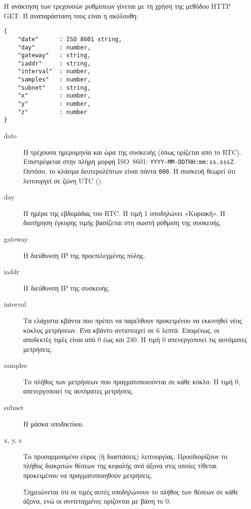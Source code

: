 
Η ανάκτηση των τρεχουσών ρυθμίσεων γίνεται με τη χρήση της μεθόδου HTTP GET. Η
αναπαράσταση τους είναι η ακόλουθη:
\begin{lstlisting}
{
    "date"      : ISO 8601 string,
    "day"       : number,
    "gateway"   : string,
    "iaddr"     : string,
    "interval"  : number,
    "samples"   : number,
    "subnet"    : string,
    "x"         : number,
    "y"         : number,
    "z"         : number
}
\end{lstlisting}
\begin{description}
    \item[date] Η τρέχουσα ημερομηνία και ώρα της συσκευής (όπως ορίζεται από το
    RTC). Επιστρέφεται στην πλήρη μορφή ISO~8601:
    \verb~YYYY-MM-DDTHH:mm:ss.sssZ~. Ωστόσο, το κλάσμα δευτερολέπτων είναι πάντα
    \verb~000~. Η συσκευή θεωρεί ότι λειτουργεί σε ζώνη UTC ().

    \item[day] Η ημέρα της εβδομάδας του RTC. Η τιμή 1 υποδηλώνει «Κυριακή». Η
    διατήρηση έγκυρης τιμής βασίζεται στη σωστή ρύθμιση της συσκευής.

    \item[gateway] Η διεύθυνση IP της προεπιλεγμένης πύλης.

    \item[iaddr] Η διεύθυνση IP της συσκευής.

    \item[interval] Τα ελάχιστα κβάντα που πρέπει να παρέλθουν προκειμένου να
    εκκινηθεί νέος κύκλος μετρήσεων. Ένα κβάντο αντιστοιχεί σε 6 λεπτά.
    Επομένως, οι αποδεκτές τιμές είναι από 0 έως και 240. Η τιμή 0 απενεργοποιεί
    τις αυτόματες μετρήσεις.

    \item[samples] Το πλήθος των μετρήσεων που πραγματοποιούνται σε κάθε κύκλο.
    Η τιμή 0, απενεργοποιεί τις αυτόματες μετρήσεις.

    \item[subnet] Η μάσκα υποδικτύου.

    \item[x, y, z] Το προσαρμοσμένο εύρος (ή διαστάσεις) λειτουργίας.
    Προσδιορίζουν το πλήθος διακριτών θέσεων της κεφαλής ανά άξονα στις οποίες
    τίθεται προκειμένου να πραγματοποιηθούν μετρήσεις.

    Σημειώνεται ότι οι τιμές αυτές υποδηλώνουν το \emph{πλήθος} των θέσεων σε
    κάθε άξονα, ενώ οι \emph{συντεταγμένες} ορίζονται με βάση το 0.
\end{description}


